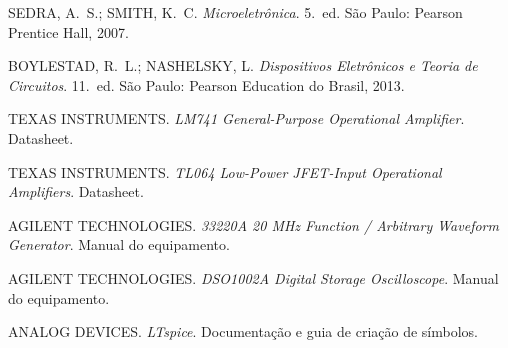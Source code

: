 \documentclass[11pt,a4paper]{article}
\begin{document}
\begin{referencias}
\item SEDRA, A.~S.; SMITH, K.~C. \emph{Microeletrônica}. 5.~ed. São Paulo: Pearson Prentice Hall, 2007.
\item BOYLESTAD, R.~L.; NASHELSKY, L. \emph{Dispositivos Eletrônicos e Teoria de Circuitos}. 11.~ed. São Paulo: Pearson Education do Brasil, 2013.
\item TEXAS INSTRUMENTS. \emph{LM741 General-Purpose Operational Amplifier}. Datasheet.
\item TEXAS INSTRUMENTS. \emph{TL064 Low-Power JFET-Input Operational Amplifiers}. Datasheet.
\item AGILENT TECHNOLOGIES. \emph{33220A 20 MHz Function / Arbitrary Waveform Generator}. Manual do equipamento.
\item AGILENT TECHNOLOGIES. \emph{DSO1002A Digital Storage Oscilloscope}. Manual do equipamento.
\item ANALOG DEVICES. \emph{LTspice}. Documentação e guia de criação de símbolos.
\end{referencias}
\end{document}
